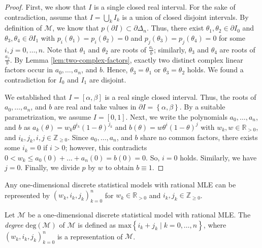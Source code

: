\begin{proof}
    First, we show that \( I \) is a single closed real interval. For the sake of contradiction, assume that \( I = \bigcup_{k} I_k \) is a union of closed disjoint intervals. By definition of \( \mathcal{M} \), we know that \( p(\partial I) \subset \partial \Delta_n \). Thus, there exist \( \theta_1, \theta_2 \in \partial I_0 \) and \( \theta_3, \theta_4 \in \partial I_1 \) with \( p_i(\theta_1) = p_i(\theta_2) =  0 \) and \( p_j(\theta_3) = p_j(\theta_4) = 0 \) for some \( i,j = 0, \dots, n \). Note that \( \theta_1 \) and \( \theta_2 \) are roots of \( \frac{a_i}{b} \); similarly,  \( \theta_3 \) and \( \theta_4 \) are roots of \( \frac{a_j}{b} \). By Lemma \ref{lem:two-complex-factors}, exactly two distinct complex linear factors occur in \( a_0, \dots, a_n \), and \( b \). Hence, \( \theta_3 = \theta_1 \) or \( \theta_3 = \theta_2 \) holds. We found a contradiction for \( I_0 \) and \( I_1 \) are disjoint.

    We established that \( I = [\alpha, \beta ]\) is a real single closed interval. Thus, the roots of \( a_0, \dots, a_n\), and \( b \) are real and take values in \( \partial I = \left\{ \alpha, \beta \right\} \). By a suitable parametrization, we assume \( I = [0,1] \). Next, we write the polynomials \( a_0, \dots, a_n\), and \( b \) as \(  a_k(\theta) = w_k \theta^{i_k} (1-\theta)^{j_k} \) and \( b(\theta) = w \theta^{i} (1-\theta)^{j} \)
    with \( w_k, w \in \mathbb{R}_{>0} \), and \( i_k, j_k, i, j \in \mathbb{Z}_{\geq 0} \). Since \( a_0, \dots, a_n\), and \( b \) share no common factors, there exists some \( i_k = 0 \) if \( i > 0 \); however, this contradicts \(0 < w_k \leq a_0(0) + \dots + a_n(0) = b(0) = 0\). So, \( i = 0 \) holds. Similarly, we have \( j = 0 \). Finally, we divide \( p \) by \( w \) to obtain \( b \equiv 1 \).
\end{proof}

\begin{corollary}
    Any one-dimensional {discrete} {statistical} {models} with rational MLE can be represented by \( (w_k, i_k, j_k)_{k=0}^n \) for \( w_k \in \mathbb{R}_{>0} \) and \( i_k, j_k \in \mathbb{Z}_{\geq 0} \).
\end{corollary}

\begin{definition}
    Let \( \mathcal{M} \) be a one-dimensional discrete statistical model with rational MLE. The \emph{degree} \( \mathrm{deg}(\mathcal{M}) \) of \( \mathcal{M} \) is defined as \( \mathrm{max}\left\{ i_k + j_k \mid k = 0, \dots, n \right\} \), where \( (w_k, i_k, j_k)_{k=0}^n \) is a representation of \( \mathcal{M} \).
\end{definition}

